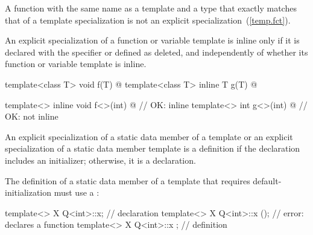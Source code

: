 \pnum
A function with the same name as a template and a type that exactly matches that
of a template specialization is not an explicit specialization~(\ref{temp.fct}).

\pnum
An explicit specialization of a function or variable template is inline
only if it is declared with the 
specifier or defined as deleted, and independently of whether its
function or variable template is inline.
\begin{example}

\begin{codeblock}
template<class T> void f(T) { @\commentellip@ }
template<class T> inline T g(T) { @\commentellip@ }

template<> inline void f<>(int) { @\commentellip@ }   // OK: inline
template<> int g<>(int) { @\commentellip@ }           // OK: not inline
\end{codeblock}
\end{example}

\pnum
An explicit specialization of a static data member of a template
or an explicit specialization of a static data member template is a
definition if the declaration includes an initializer;
otherwise, it is a declaration.
\begin{note}
The definition of a static data member of a template
that requires default-initialization must use a :

\begin{codeblock}
template<> X Q<int>::x;         // declaration
template<> X Q<int>::x ();      // error: declares a function
template<> X Q<int>::x { };     // definition
\end{codeblock}
\end{note}

